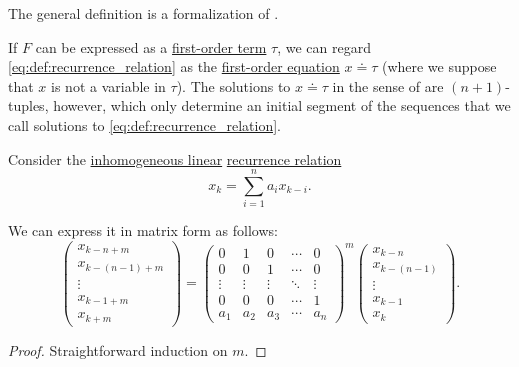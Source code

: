 \begin{comments}
  \item The general definition is a formalization of \cite[def. 2.4.4]{Rosen2019DiscreteMathematics}.

  \item If \( F \) can be expressed as a \hyperref[def:first_order_syntax/term]{first-order term} \( \tau \), we can regard \eqref{eq:def:recurrence_relation} as the \hyperref[def:first_order_equation]{first-order equation} \( x \doteq \tau \) (where we suppose that \( x \) is not a variable in \( \tau \)). The solutions to \( x \doteq \tau \) in the sense of  are \( (n + 1) \)-tuples, however, which only determine an initial segment of the sequences that we call solutions to \eqref{eq:def:recurrence_relation}.
\end{comments}

\begin{proposition}\label{thm:linear_recurrence_relation}
  Consider the \hyperref[def:recurrence_relation/linear]{inhomogeneous linear} \hyperref[def:recurrence_relation]{recurrence relation}
  \begin{equation*}
    x_k = \sum_{i=1}^n a_i x_{k-i}.
  \end{equation*}

  We can express it in matrix form as follows:
  \begin{equation}\label{eq:thm:linear_recurrence_relation}
    \begin{pmatrix}
      x_{k-n+m}     \\
      x_{k-(n-1)+m} \\
      \vdots        \\
      x_{k-1+m}     \\
      x_{k+m}
    \end{pmatrix}
    =
    \begin{pmatrix}
      0      & 1      & 0      & \cdots & 0      \\
      0      & 0      & 1      & \cdots & 0      \\
      \vdots & \vdots & \vdots & \ddots & \vdots \\
      0      & 0      & 0      & \cdots & 1      \\
      a_1    & a_2    & a_3    & \cdots & a_n
    \end{pmatrix}^m
    \begin{pmatrix}
      x_{k-n}     \\
      x_{k-(n-1)} \\
      \vdots      \\
      x_{k-1}     \\
      x_k
    \end{pmatrix}.
  \end{equation}
\end{proposition}
\begin{proof}
  Straightforward induction on \( m \).
\end{proof}


